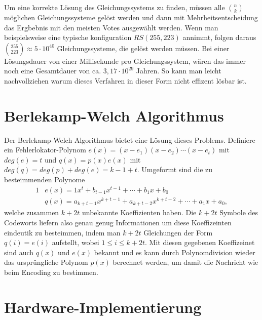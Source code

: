 Um eine korrekte Lösung des Gleichungssystems zu finden, müssen alle $\binom{n}{k}$ möglichen Gleichungssysteme gelöst werden und dann mit Mehrheitsentscheidung das Ergbebnis mit den meisten Votes ausgewählt werden. 
Wenn man beispielsweise eine typische konfiguration $RS(255,223)$ annimmt, folgen daraus $\binom{255}{223}\approx5\cdot 10^{40}$ Gleichungssysteme, die gelöst werden müssen.
Bei einer Lösungsdauer von einer Millisekunde pro Gleichungssystem, wären das immer noch eine Gesamtdauer von ca. $3,17\cdot10^{29}$ Jahren. 
So kann man leicht nachvollziehen warum dieses Verfahren in dieser Form nicht effizent lösbar ist.

\section{Berlekamp-Welch Algorithmus}\label{sec:bwAlgo}

Der Berlekamp-Welch Algorithmus bietet eine Lösung dieses Problems. 
Definiere ein Fehlerlokator-Polynom $e(x)=(x-e_1)(x-e_2)\cdots(x-e_t)$ mit $deg(e)=t$ und $q(x)=p(x)e(x)$ mit $deg(q)=deg(p)+deg(e)=k-1+t$.
Umgeformt sind die zu besteimmenden Polynome
\begin{alignat}{1}
	&e(x)=1x^t+b_{t-1}x^{t-1}+\cdots+b_1x+b_0\nonumber\\
	&q(x)=a_{k+t-1}x^{k+t-1}+a_{k+t-2}x^{k+t-2}+\cdots+a_1x+a_0,\nonumber
\end{alignat}
welche zusammen $k+2t$ unbekannte Koeffizienten haben.
Die $k+2t$ Symbole des Codeworts liefern also genau genug Informationen um diese Koeffizeinten eindeutik zu besteimmen, indem man $k+2t$ Gleichungen der Form $q(i)=e(i)$ aufstellt, wobei $1\leq i\leq k+2t$.
Mit diesen gegebenen Koeffizeinet sind auch $q(x)$ und $e(x)$ bekannt und es kann durch Polynomdivision wieder das ursprüngliche Polynom $p(x)$ berechnet werden, um damit die Nachricht wie beim Encoding zu bestimmen.

\section{Hardware-Implementierung}\label{sec:hardware}

